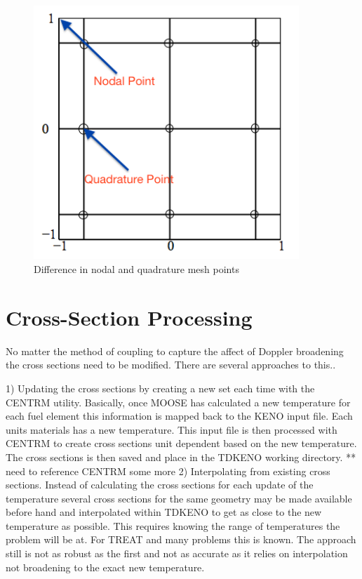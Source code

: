 \documentclass[11pt]{article}
\begin{document}
\begin{figure}
    \centering
    \includegraphics[width=10cm]{figures/nodalvsquad.png}
    \caption{Difference in nodal and quadrature mesh points}
    \label{fig:nodalquad}
\end{figure}

\section{Cross-Section Processing}
No matter the method of coupling to capture the affect of Doppler broadening the cross sections need to be modified.  There are several approaches to this..

1)	Updating the cross sections by creating a new set each time with the CENTRM utility.  Basically, once MOOSE has calculated a new temperature for each fuel element this information is mapped back to the KENO input file.  Each units materials has a new temperature.  This input file is then processed with CENTRM to create cross sections unit dependent based on the new temperature. The cross sections is then saved and place in the TDKENO working directory. ** need to reference CENTRM some more
2)	Interpolating from existing cross sections.  Instead of calculating the cross sections for each update of the temperature several cross sections for the same geometry may be made available before hand and interpolated within TDKENO to get as close to the new temperature as possible.  This requires knowing the range of temperatures the problem will be at.  For TREAT and many problems this is known.  The approach still is not as robust as the first and not as accurate as it relies on interpolation not broadening to the exact new temperature.  
\end{document}
